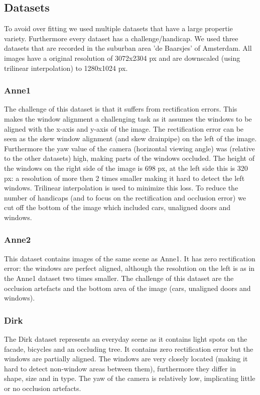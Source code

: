 \subsection{Datasets}
To avoid over fitting we used multiple datasets that have a large propertie
variety. Furthermore every dataset has a challenge/handicap.
We used three datasets that are recorded in the suburban area
'de Baarsjes' of Amsterdam.  All images have a original resolution of 3072x2304
px and are downscaled (using trilinear interpolation) to 1280x1024 px.

\subsubsection{Anne1}
The challenge of this dataset is that it suffers from rectification errors.
This makes the window alignment a challenging task as it assumes the windows to
be aligned with the x-axis and y-axis of the image.
The rectification error can be seen as the skew window alignment (and skew
drainpipe) on the left of the image. 
Furthermore the yaw value of the camera (horizontal viewing angle) was (relative
to the other datasets) high, making parts of the windows occluded.  The height
of the windows on the right side of the image is 698 px, at the left side this
is 320 px: a resolution of more then 2 times smaller making it hard to detect
the left windows. Trilinear interpolation is used to minimize this loss.
To reduce the number of handicaps (and to focus on the rectification and
occlusion error) we cut off the bottom of the image which included cars, unaligned doors and windows.
\clearpage

\subsubsection{Anne2}
This dataset contains images of the same scene as Anne1.
It has zero rectification error: the windows are perfect aligned, although the
resolution on the left is as in the Anne1 dataset two times smaller.
The challenge of this dataset are the occlusion artefacts and the 
bottom area of the image (cars, unaligned doors and windows).
\clearpage

\subsubsection{Dirk}
The Dirk dataset represents an everyday scene as it contains light spots on the facade,
bicycles and an occluding tree.  It contains zero rectification error but the
windows are partially aligned.  The windows are very closely located (making it
hard to detect non-window areas between them), furthermore they differ in shape, size
and in type.  The yaw of the camera is relatively low, implicating little or no
occlusion artefacts.
\clearpage

